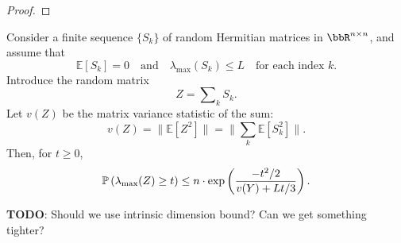 \documentclass[12pt]{article}
\newcommand{\E}{\mathbb{E}} %
\begin{document}
\begin{proof}



\end{proof}


\begin{theorem} \label{thm:intdim-bernstein-herm}
	Consider a finite sequence $\{ S_k \}$ of random Hermitian matrices in $\RR^{n\times n}$, and assume that
	\begin{equation*}
	\E [S_k] = 0
	\quad\text{and}\quad
	\lambda_{\max}(S_k) \leq L
	\quad\text{for each index $k$.}
	\end{equation*}
	Introduce the random matrix
	\begin{equation*}
	Z = \sum\nolimits_k S_k.
	\end{equation*}
	Let $v(Z)$ be the matrix variance statistic of the sum:
	\begin{equation*}
	v(Z) = \|\E [Z^2]\| = \|\sum_k \E [S_k^2]\|.
	\end{equation*}
	Then, for $t \geq 0$,
	\begin{equation} \label{eqn:intdim-bernstein-tail}
	\Prob \left( \lambda_{\max}(Z) \geq t \right)
	\leq n \cdot \exp\left( \frac{-t^2/2}{v(Y) + Lt/3} \right).
	\end{equation}
	\label{thm:bernstein}
\end{theorem}
\textbf{TODO}: Should we use intrinsic dimension bound? Can we get something tighter?
\end{document}
